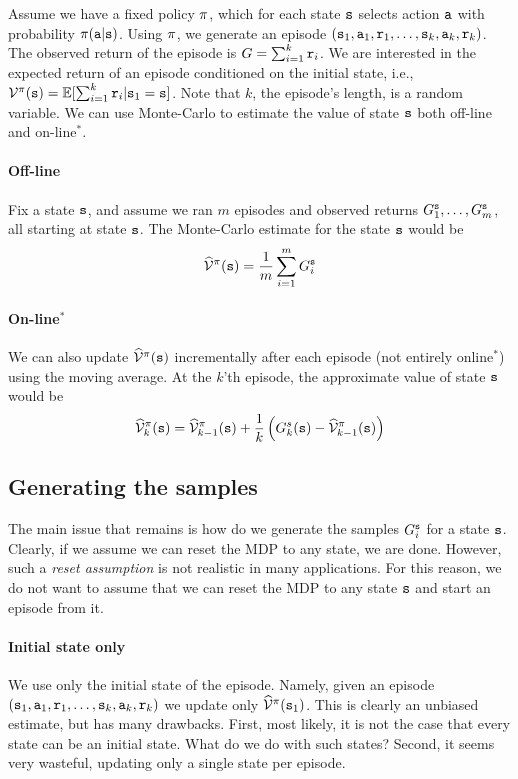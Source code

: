 Assume we have a fixed policy $\pi$, which for each state
${\tt s}$ selects action ${\tt a}$ with probability
$\pi({\tt a}|{\tt s})$. Using $\pi$, we generate an episode
$({\tt s}_1, {\tt a}_1, {\tt r}_1, \ldots ,
{\tt s}_k,{\tt a}_k,{\tt r}_k)$. The observed return of the episode
is $G=\sum_{i=1}^k {\tt r}_i$. We are interested in the expected
return of an episode conditioned on the initial state, i.e.,
$\mathcal{V}^\pi({\tt s})=\mathbb{E}[\sum_{i=1}^k {\tt r}_i |{\tt s}_1={\tt s}]$.
Note that $k$, the episode's length, is a random variable.
We can use Monte-Carlo to estimate the value of state ${\tt s}$ both off-line and on-line$^{*}$.

\paragraph{Off-line}
Fix a state ${\tt s}$, and assume we ran $m$ episodes and
observed returns $G^{\tt s}_1, \ldots , G^{\tt s}_m$, all starting at state ${\tt s}$. 
The Monte-Carlo estimate for the state ${\tt s}$ would be
\[\widehat{\mathcal{V}}^\pi({\tt s})=\frac{1}{m}\sum_{i=1}^m G_i^{\tt s}\] 

\paragraph{On-line$^{*}$}
We can also update $\widehat{\mathcal{V}}^{\pi}({\tt s})$ incrementally after
each episode (not entirely online$^{*}$) using the moving average.
At the $k$'th episode, the approximate value of state ${\tt s}$ would be
\[\widehat{\mathcal{V}}^{\pi}_{k}({\tt s})=\widehat{\mathcal{V}}^{\pi}_{k-1}({\tt s})
+\frac{1}{k} \left(G^{s}_{k}({\tt s})-\widehat{\mathcal{V}}^{\pi}_{k-1}({\tt s})\right)\] 

\subsection{Generating the samples}
The main issue that remains is how do we generate the samples $G^{\tt s}_i$
for a state ${\tt s}$. Clearly, if we assume we can reset the MDP to
any state, we are done. However, such a \emph{reset assumption} is
not realistic in many applications. For this reason, we do not want
to assume that we can reset the MDP to any state ${\tt s}$ and start
an episode from it.

\paragraph{Initial state only}
We use only the initial state of the episode. Namely, given an
episode $({\tt s}_1, {\tt a}_1, {\tt r}_1, \ldots ,
{\tt s}_k,{\tt a}_k,{\tt r}_k)$ we update only
$\widehat{\mathcal{V}}^\pi({\tt s}_1)$. This is clearly an unbiased
estimate, but has many drawbacks. First, most likely, it is not the
case that every state can be an initial state. What do we do with
such states? Second, it seems very wasteful, updating only a single
state per episode.

